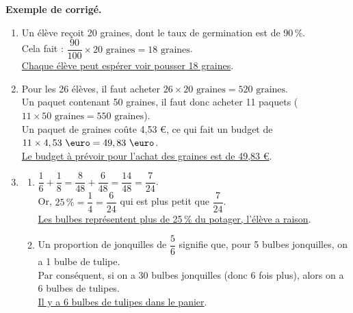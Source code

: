 \begin{activite}
   \bigskip
     
   \textcolor{G1}{
   {\bf Exemple de corrigé.} \smallskip
      \begin{enumerate}
         \item Un élève reçoit 20 graines, dont le taux de germination est de 90\,\%. \\ [1mm]
            Cela fait : $\dfrac{90}{100}\times20\text{ graines} =18\text{ graines}$. \\ [1mm]
            \uline{Chaque élève peut espérer voir pousser 18 graines}.
         \item Pour les 26 élèves, il faut acheter $26\times20\text{ graines} =520\text{ graines}$. \\
            Un paquet contenant 50 graines, il faut donc acheter 11 paquets ($11\times50\text{ graines} =550\text{ graines}$). \\
            Un paquet de graines coûte 4,53 \euro, ce qui fait un budget de $11\times4,53\text{ \euro} =49,83\text{ \euro}$. \\
            \uline{Le budget à prévoir pour l'achat des graines est de 49,83 \euro}. \smallskip
         \item
            \begin{enumerate}
               \item $\dfrac16+\dfrac18 =\dfrac8{48}+\dfrac6{48} =\dfrac{14}{48} =\dfrac{7}{24}$. \\ [1mm]
                  Or, $25\,\% =\dfrac14 =\dfrac{6}{24}$ qui est plus petit que $\dfrac7{24}$. \\ [1mm]
                  \uline{Les bulbes représentent plus de 25\,\% du potager, l'élève a raison}. \smallskip     
               \item Un proportion de jonquilles de $\dfrac56$ signifie que, pour 5 bulbes jonquilles, on a 1 bulbe de tulipe. \\ [1mm]
                 Par conséquent, si on a 30 bulbes jonquilles (donc 6 fois plus), alors on a 6 bulbes de tulipes. \\
                 \uline{Il y a 6 bulbes de tulipes dans le panier}. \\
           \end{enumerate}
      \end{enumerate}
   }
\end{activite}

\pagebreak


